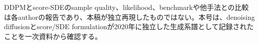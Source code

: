 \begin{claimboundary}
DDPMとscore-SDEのsample quality、likelihood、benchmarkや他手法との比較は各authorの報告であり、本稿が独立再現したものではない。本号は、denoising diffusionとscore/SDE formulationが2020年に独立した生成系譜として記録されたことを一次資料から確認する。\autocite{src-c012a248ff78,src-d6e451e5085e}
\end{claimboundary}
